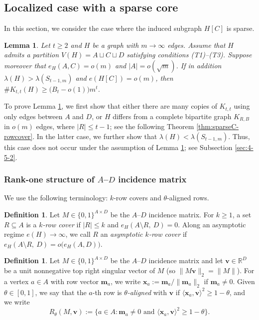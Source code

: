 \documentclass[11pt]{article}
\newtheorem{lemma}[theorem]{Lemma}
\theoremstyle{definition}
\newtheorem{definition}[theorem]{Definition}
\theoremstyle{plain}
\newcommand{\Ktt}{K_{t,t}}
\begin{document}
\subsection{Localized case with a sparse core}

In this section, 
we consider the case where the induced subgraph $H[C]$ is sparse. 

\begin{lemma} \label{lem:lemmaD-localized-sparse} 
Let \(t\ge2\) and $H$ be a graph with $m\to \infty$ edges. 
Assume that $H$ admits a partition $V(H)=A\sqcup C\sqcup D$ satisfying conditions
\textup{(T1)}--\textup{(T3)}. Suppose moreover that
 $e_H(A,C)=o(m)$ and $|A|=o(\sqrt{m})$. 
 If in addition $\lambda(H)>\lambda(S_{t-1,m})$ and $e(H[C])=o(m)$,  then $\texttt{\#}\Ktt(H)\ge \bigl(B_t-o(1)\bigr) m^t$.
\end{lemma}

To prove Lemma \ref{lem:lemmaD-localized-sparse}, we first show that either there are many copies of $K_{t,t}$ using only edges between $A$ and $D$, or $H$ differs from a complete bipartite graph $K_{R,B}$ in $o(m)$ edges, where $|R|\le t-1$; see the following Theorem \ref{thm:sparseC-rowcover}.  
In the latter case, we further show that 
$\lambda (H)< \lambda (S_{t-1,m})$. Thus, this case does not occur under the assumption of Lemma \ref{lem:lemmaD-localized-sparse}; see Subsection \ref{sec:4-5-2}.   

\subsubsection{Rank-one structure of $A$--$D$ incidence matrix}

\label{sec:4-5-1}

We use the following terminology: \(k\)-row covers and \(\theta\)-aligned rows.

\begin{definition} \label{def:row-cover}
Let $M\in\{0,1\}^{A\times D}$ be the $A$--$D$ incidence matrix.
For $k\ge 1$, a set $R\subseteq A$ is a \emph{$k$-row cover} if $|R|\le k$ and $e_H(A\setminus R,\ D)=0$.
Along an asymptotic regime $e(H)\to\infty$, we call $R$ an \emph{asymptotic $k$-row cover} if
$e_H(A\setminus R,\ D)=o\bigl(e_H(A,D)\bigr)$.
\end{definition}

\begin{definition} \label{def:aligned-rows}
Let $M\in\{0,1\}^{A\times D}$ be the $A$--$D$ incidence matrix and let $\bm{v}\in\mathbb R^D$ be a unit nonnegative top right singular vector of $M$
(so $\|M \bm{v}\|_2=\|M\|$).
For a vertex $a\in A$ with row vector $\bm{m}_a$, we write $\bm{x}_a:=\bm{m}_a/\|\bm{m}_a\|_2$ if $\bm{m}_a\neq 0$.
Given $\theta\in[0,1]$, we say that the $a$-th row is \emph{$\theta$-aligned} with $\bm{v}$ if $\langle \bm{x}_a,\bm{v}\rangle^2\ge 1-\theta$, and we write
\[
 R_\theta(M,\bm{v}) 
 :=
 \big\{a\in A: \bm{m}_a\neq 0\text{ and }\langle \bm{x}_a,\bm{v}\rangle^2\ge 1-\theta \big\}.
\]
\end{definition}
\end{document}
